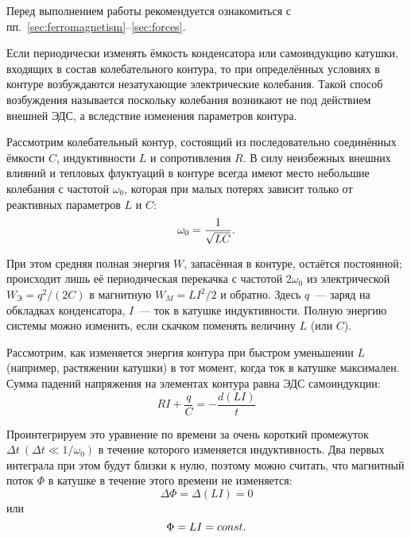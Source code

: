 


Перед выполнением работы рекомендуется ознакомиться с
пп.~\ref{sec:ferromagnetism}--\ref{sec:forces}.

Если периодически изменять ёмкость конденсатора или самоиндукцию катушки, входящих в состав колебательного контура, то при определённых условиях в контуре возбуждаются незатухающие электрические колебания. Такой способ возбуждения называется  поскольку колебания возникают не под действием внешней ЭДС, а вследствие изменения параметров контура.

Рассмотрим колебательный контур, состоящий из последовательно соединённых ёмкости $C$, индуктивности $L$ и сопротивления $R$. В силу неизбежных внешних влияний и тепловых флуктуаций в контуре всегда имеют место небольшие колебания с частотой $\omega_0$, которая при малых потерях зависит только от реактивных параметров $L$ и $C$:
\begin{equation}
	\eqmark{4.6.1}
	 \omega_0 = \frac{1}{\sqrt{LC}}.
\end{equation}

При этом средняя полная энергия $W$, запасённая в контуре, остаётся постоянной; происходит лишь её периодическая перекачка с частотой $2\omega_0$ из электрической $W_\text{Э} = q^2 / (2C)$ в магнитную $W_M = LI^2/2$ и обратно. Здесь $q$~--- заряд на обкладках конденсатора, $I$~--- ток в катушке индуктивности. Полную энергию системы можно изменить, если скачком поменять величину $L$ (или $C$).

 Рассмотрим, как изменяется энергия контура при быстром уменьшении $L$ (например, растяжении катушки) в тот момент, когда ток в катушке максимален. Сумма падений напряжения на элементах контура равна ЭДС самоиндукции:
\begin{equation*}
	RI + \frac{q}{C}= - \frac{d(LI)}{t}
\end{equation*}

Проинтегрируем это уравнение по времени за очень короткий промежуток $\Delta t ~(\Delta t \ll 1/\omega_0)$ в течение которого изменяется индуктивность. Два первых интеграла при этом будут близки к нулю, поэтому можно считать, что магнитный поток $\Phi$ в катушке в течение этого времени не изменяется:
\begin{equation*}
	\Delta \Phi=\Delta (LI) = 0
\end{equation*}
 или
\begin{equation}
	\eqmark{4.6.2}
	\Phi=LI =const.
\end{equation}

